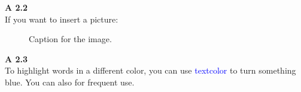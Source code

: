 \documentclass{article}
\newcommand{\important}[1]{{\color{blue}{\bf\sf #1}}}
\begin{document}
\noindent
\textbf{A 2.2}\\

If you want to insert a picture:

\begin{figure}[h]
\centering
\caption{Caption for the image.}
\label{fig:image1}
\end{figure}

\noindent
\textbf{A 2.3}\\

To highlight words in a different color, you can use \textcolor{blue}{textcolor} to turn something blue. You can also \important{define custom commands} for frequent use.
\end{document}
